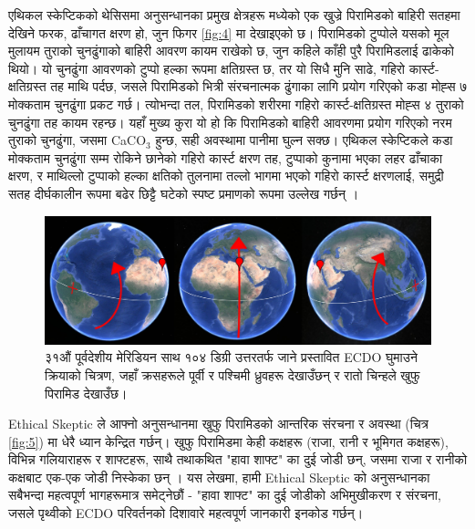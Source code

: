 \documentclass[10pt,twocolumn,letterpaper]{article}
\begin{document}
एथिकल स्केप्टिकको थेसिसमा अनुसन्धानका प्रमुख क्षेत्रहरू मध्येको एक खुज्रे पिरामिडको बाहिरी सतहमा देखिने फरक, ढाँचागत क्षरण हो, जुन फिगर \ref{fig:4} मा देखाइएको छ। पिरामिडको टुप्पोले यसको मूल मुलायम तुराको चुनढुंगाको बाहिरी आवरण कायम राखेको छ, जुन कहिले काँही पुरै पिरामिडलाई ढाकेको थियो। यो चुनढुंगा आवरणको टुप्पो हल्का रूपमा क्षतिग्रस्त छ, तर यो सिधै मुनि साढे, गहिरो कार्स्ट-क्षतिग्रस्त तह माथि पर्दछ, जसले पिरामिडको भित्री संरचनात्मक ढुंगाका लागि प्रयोग गरिएको कडा मोह्स ७ मोक्कताम चुनढुंगा प्रकट गर्छ। त्योभन्दा तल, पिरामिडको शरीरमा गहिरो कार्स्ट-क्षतिग्रस्त मोह्स ४ तुराको चुनढुंगा तह कायम रहन्छ। यहाँ मुख्य कुरा यो हो कि पिरामिडको बाहिरी आवरणमा प्रयोग गरिएको नरम तुराको चुनढुंगा, जसमा CaCO$_3$ हुन्छ, सही अवस्थामा पानीमा घुल्न सक्छ। एथिकल स्केप्टिकले कडा मोक्कताम चुनढुंगा सम्म रोकिने छानेको गहिरो कार्स्ट क्षरण तह, टुप्पाको कुनामा भएका लहर ढाँचाका क्षरण, र माथिल्लो टुप्पाको हल्का क्षतिको तुलनामा तल्लो भागमा भएको गहिरो कार्स्ट क्षरणलाई, समुद्री सतह दीर्घकालीन रूपमा बढेर छिट्टै घटेको स्पष्ट प्रमाणको रूपमा उल्लेख गर्छन् \cite{27}।
\begin{figure}[b]
\begin{center}
\includegraphics[width=1\textwidth]{drawing.jpg}
\end{center}
   \caption{३१औं पूर्वदेशीय मेरिडियन साथ १०४ डिग्री उत्तरतर्फ जाने प्रस्तावित ECDO घुमाउने क्रियाको चित्रण, जहाँ क्रसहरूले पूर्वी र पश्चिमी ध्रुवहरू देखाउँछन् र रातो चिन्हले खुफु पिरामिड देखाउँछ।}
\label{fig:6}
\end{figure}
Ethical Skeptic ले आफ्नो अनुसन्धानमा \cite{28} खुफु पिरामिडको आन्तरिक संरचना र अवस्था (चित्र \ref{fig:5}) मा धेरै ध्यान केन्द्रित गर्छन्। खुफु पिरामिडमा केही कक्षहरू (राजा, रानी र भूमिगत कक्षहरू), विभिन्न गलियाराहरू र शाफ्टहरू, साथै तथाकथित "हावा शाफ्ट" का दुई जोडी छन्, जसमा राजा र रानीको कक्षबाट एक-एक जोडी निस्केका छन् \cite{29,30}। यस लेखमा, हामी Ethical Skeptic को अनुसन्धानका सबैभन्दा महत्वपूर्ण भागहरूमात्र समेट्नेछौं - "हावा शाफ्ट" का दुई जोडीको अभिमुखीकरण र संरचना, जसले पृथ्वीको ECDO परिवर्तनको दिशावारे महत्वपूर्ण जानकारी इनकोड गर्छन्।
\end{document}
